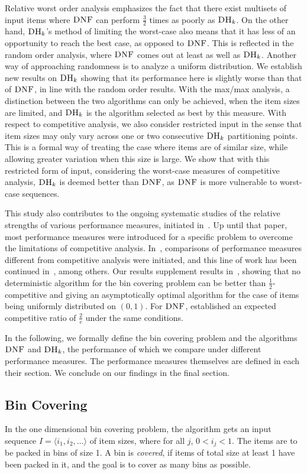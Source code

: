 \documentclass[11pt]{article}
\newcommand{\DNF}{\ensuremath{\operatorname{\textsc{DNF}}}\xspace}
\newcommand{\DHk}{{\ensuremath{\textsc{DH}_k}}\xspace}
\newcommand{\SEQ}[1]{\langle #1 \rangle}
\begin{document}
Relative worst order analysis emphasizes the fact that there
exist multisets of input items where \DNF can perform
$\frac{3}{2}$ times as poorly as \DHk. On the other hand,
\DHk's method of limiting the worst-case also means that it has less
of an opportunity to reach the best case, as opposed to \DNF.
This is reflected in the random order analysis, where \DNF
comes out at least as well as \DHk.
Another way of approaching randomness is to analyze a uniform distribution.
We establish new results on \DHk showing that its performance here
is slightly worse than that of \DNF, in line with the random order results.
With the max/max analysis, a distinction between the two algorithms 
can only be achieved, when the item sizes are limited, and
\DHk is the algorithm selected as best by this measure.
With respect to competitive analysis,
we also consider restricted input in the sense that item sizes may
only vary across one or two consecutive \DHk partitioning points. This is a
formal way of treating the case where items are of similar size,
while allowing greater variation when this size is large. We show
that with this restricted form of input, considering the
worst-case measures of competitive analysis, \DHk is deemed
better than \DNF, as \DNF is more vulnerable to
worst-case sequences. 

This study also contributes to the ongoing systematic studies of
the relative strengths of various performance measures,
initiated in~\cite{BIL09p}. Up until that paper, most performance
measures were introduced for a specific problem to 
overcome the limitations of
competitive analysis. In~\cite{BIL09p}, comparisons
of performance measures different from competitive analysis
were initiated, and this line of work has been continued
in~\cite{BGL12p,BLM12p,BGL13}, among others.
Our results supplement results in~\cite{C88},
showing that
no deterministic algorithm for the bin covering problem
can be better than $\frac{1}{2}$-competitive and
giving an asymptotically optimal algorithm for the case of items
being uniformly distributed on $(0,1)$.
For \DNF, \cite{CFGK91} established an expected competitive
ratio of $\frac{2}{e}$ under the same conditions.

In the following, we formally define the bin covering problem and the
algorithms \DNF and \DHk, the performance of which we compare under
different performance measures. The performance measures themselves are
defined in each their section.
We conclude on our findings in the final section.

\subsection*{Bin Covering}
In the one dimensional bin covering problem, the algorithm gets an input
sequence $I=\SEQ{i_1,i_2,\dots}$ of item sizes, where for all $j$, $0 < i_j < 1$.
The items are to be packed in bins of size 1.
A bin is {\em covered}, if items of total size at least 1 have been
 packed in it, and
the goal is to cover as many bins as possible.
\end{document}
